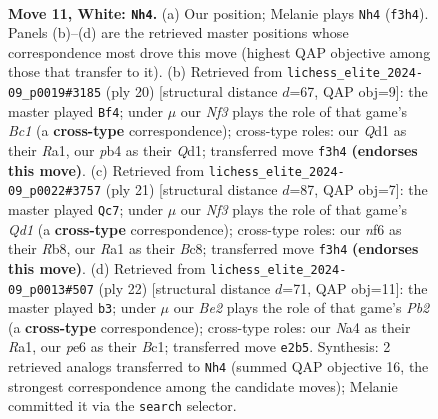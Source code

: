 \documentclass[11pt]{article}
\begin{document}
\clearpage

\begin{figure}[p]\centering
\begin{subfigure}{0.46\textwidth}\centering
\resizebox{\linewidth}{!}{%
\newchessgame
\chessboard[
  setfen={r1bqkb1r/p2n1ppp/2p1pn2/8/Np1P4/4PN2/PP2BPPP/R1BQ1RK1 w - - 2 11},
  showmover=false,
  pgfstyle=straightmove, color=movearrow, markmove={f3-h4}
]}
\caption{}
\end{subfigure}\hfill
\begin{subfigure}{0.46\textwidth}\centering
\resizebox{\linewidth}{!}{%
\newchessgame
\chessboard[
  setfen={r2qkb1r/pp1n1pp1/2p1pn1p/5b2/2PP4/2N2N2/PP2BPPP/R1BQ1RK1 w kq - 0 11},
  showmover=false,
  pgfstyle=straightmove, color=movearrow, markmove={c1-f4}
]}
\caption{}
\end{subfigure}
\\[4pt]
\begin{subfigure}{0.46\textwidth}\centering
\resizebox{\linewidth}{!}{%
\newchessgame
\chessboard[
  setfen={1rbq1rk1/4bppp/2n1pn2/pppp4/8/P2PPN2/1PPN1PPP/R1BQKB1R b K - 1 11},
  showmover=false,
  pgfstyle=straightmove, color=movearrow, markmove={d8-c7}
]}
\caption{}
\end{subfigure}\hfill
\begin{subfigure}{0.46\textwidth}\centering
\resizebox{\linewidth}{!}{%
\newchessgame
\chessboard[
  setfen={1r1qkb1r/1bpn1ppp/4pn2/8/1p6/5NP1/1PPPNPBP/R1BQ1RK1 w k - 0 12},
  showmover=false,
  pgfstyle=straightmove, color=movearrow, markmove={b2-b3}
]}
\caption{}
\end{subfigure}
\caption{\textbf{Move 11, White: \texttt{Nh4}.} (a) Our position; Melanie plays \texttt{Nh4} (\texttt{f3h4}). Panels (b)--(d) are the retrieved master positions whose correspondence most drove this move (highest QAP objective among those that transfer to it). (b) Retrieved from \texttt{lichess\_elite\_2024-09\_p0019\#3185} (ply 20) [structural distance $d$=67, QAP obj=9]: the master played \texttt{Bf4}; under $\mu$ our \emph{Nf3} plays the role of that game's \emph{Bc1} (a \textbf{cross-type} correspondence); cross-type roles: our \emph{Q}d1 as their \emph{R}a1, our \emph{p}b4 as their \emph{Q}d1; transferred move \texttt{f3h4} \textbf{(endorses this move)}. (c) Retrieved from \texttt{lichess\_elite\_2024-09\_p0022\#3757} (ply 21) [structural distance $d$=87, QAP obj=7]: the master played \texttt{Qc7}; under $\mu$ our \emph{Nf3} plays the role of that game's \emph{Qd1} (a \textbf{cross-type} correspondence); cross-type roles: our \emph{n}f6 as their \emph{R}b8, our \emph{R}a1 as their \emph{B}c8; transferred move \texttt{f3h4} \textbf{(endorses this move)}. (d) Retrieved from \texttt{lichess\_elite\_2024-09\_p0013\#507} (ply 22) [structural distance $d$=71, QAP obj=11]: the master played \texttt{b3}; under $\mu$ our \emph{Be2} plays the role of that game's \emph{Pb2} (a \textbf{cross-type} correspondence); cross-type roles: our \emph{N}a4 as their \emph{R}a1, our \emph{p}e6 as their \emph{B}c1; transferred move \texttt{e2b5}. Synthesis: 2 retrieved analogs transferred to \texttt{Nh4} (summed QAP objective 16, the strongest correspondence among the candidate moves); Melanie committed it via the \texttt{search} selector.}

\end{figure}
\end{document}
